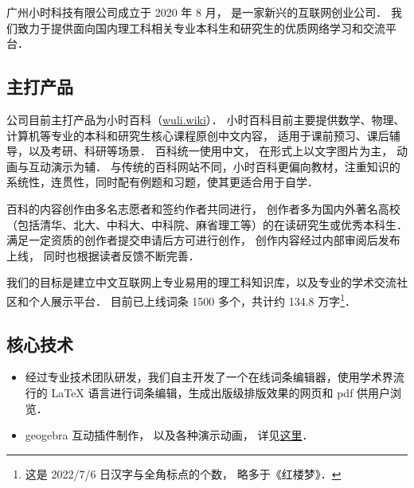 
广州小时科技有限公司成立于 2020 年 8 月， 是一家新兴的互联网创业公司． 我们致力于提供面向国内理工科相关专业本科生和研究生的优质网络学习和交流平台．

\subsection{主打产品}
公司目前主打产品为小时百科（\href{https://wuli.wiki}{wuli.wiki}）． 小时百科目前主要提供数学、物理、计算机等专业的本科和研究生核心课程原创中文内容， 适用于课前预习、课后辅导，以及考研、科研等场景． 百科统一使用中文， 在形式上以文字图片为主， 动画与互动演示为辅． 与传统的百科网站不同，小时百科更偏向教材，注重知识的系统性，连贯性，同时配有例题和习题，使其更适合用于自学．

百科的内容创作由多名志愿者和签约作者共同进行， 创作者多为国内外著名高校（包括清华、北大、中科大、中科院、麻省理工等）的在读研究生或优秀本科生． 满足一定资质的创作者提交申请后方可进行创作， 创作内容经过内部审阅后发布上线， 同时也根据读者反馈不断完善．

我们的目标是建立中文互联网上专业易用的理工科知识库，以及专业的学术交流社区和个人展示平台． 目前已上线词条 1500 多个，共计约 134.8 万字\footnote{这是 2022/7/6 日汉字与全角标点的个数， 略多于《红楼梦》．}．

\subsection{核心技术}
\begin{itemize}
\item 经过专业技术团队研发，我们自主开发了一个在线词条编辑器，使用学术界流行的 LaTeX 语言进行词条编辑，生成出版级排版效果的网页和 pdf 供用户浏览．
\item geogebra 互动插件制作， 以及各种演示动画， 详见\href{http://wuli.wiki/apps}{这里}．
\end{itemize}
